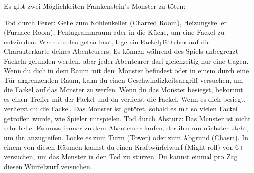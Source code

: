 





\newpage

Es gibt zwei Möglichkeiten Frankenstein's Monster zu töten:


\begin{itemize}
    \bitem Tod durch Feuer: Gehe zum Kohlenkeller (Charred Room), Heizungskeller (Furnace Room), Pentagrammraum oder in die Küche, um eine Fackel zu entzünden. Wenn du das getan hast, lege ein Fackelplättchen auf die Charakterkarte deines Abenteurers. Es können während des Spiels unbegrenzt Fackeln gefunden werden, aber jeder Abenteurer darf gleichzeitig nur eine tragen. Wenn du dich in dem Raum mit dem Monster befindest oder in einem durch eine Tür angrenzenden Raum, kann du einen Geschwindigkeitsangriff versuchen, um die Fackel auf das Monster zu werfen. Wenn du das Monster besiegst, bekommt es einen Treffer mit der Fackel und du verlierst die Fackel. Wenn es dich besiegt, verlierst du die Fackel. Das Monster ist getötet, sobald es mit so vielen Fackel getroffen wurde, wie Spieler mitspielen.
    \bitem Tod durch Absturz: Das Monster ist nicht sehr helle. Es muss immer zu dem Abenteurer laufen, der ihm am nächsten steht, um ihn anzugreifen. Locke es zum Turm (Tower) oder zum Abgrund (Chasm). In einem von diesen Räumen kannst du einen Kraftwürfelwurf (Might roll) von 6+ versuchen, um das Monster in den Tod zu stürzen. Du kannst einmal pro Zug diesen Würfelwurf versuchen.
\end{itemize}

